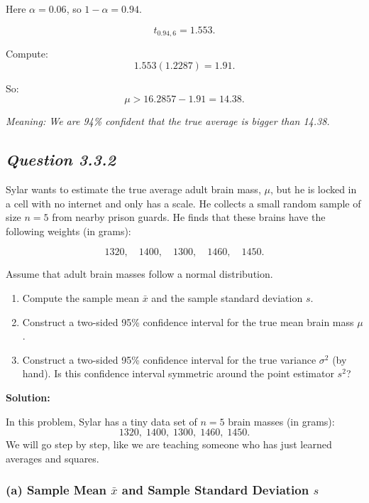 \documentclass[11pt,letterpaper]{article}
\theoremstyle{remark}
\begin{document}
Here $\alpha = 0.06$, so $1-\alpha = 0.94$.

\[
t_{0.94,6} = 1.553.
\]

Compute:
\[
1.553(1.2287) = 1.91.
\]

So:
\[
\boxed{\mu > 16.2857 - 1.91 = 14.38}.
\]

\textit{Meaning: We are 94\% confident that the true average is bigger than 14.38.}

\newpage

\subsection*{\textbf{\textit{Question 3.3.2}}}

Sylar wants to estimate the true average adult brain mass, $\mu$, but he is locked in a cell with no internet
and only has a scale. He collects a small random sample of size $n = 5$ from nearby prison guards.
He finds that these brains have the following weights (in grams):

\[
1320,\quad 1400,\quad 1300,\quad 1460,\quad 1450.
\]

Assume that adult brain masses follow a normal distribution.

\begin{enumerate}
    \item[(a)] Compute the sample mean $\bar{x}$ and the sample standard deviation $s$.
    \item[(b)] Construct a two-sided 95\% confidence interval for the true mean brain mass $\mu$.
    \item[(c)] Construct a two-sided 95\% confidence interval for the true variance $\sigma^2$ (by hand).
    Is this confidence interval symmetric around the point estimator $s^2$?
\end{enumerate}

\vspace{1cm}

\textbf{Solution:}

In this problem, Sylar has a tiny data set of $n = 5$ brain masses (in grams):
\[
1320,\; 1400,\; 1300,\; 1460,\; 1450.
\]
We will go step by step, like we are teaching someone who has just learned averages and squares.

\subsubsection*{(a) Sample Mean $\bar{x}$ and Sample Standard Deviation $s$}
\end{document}
